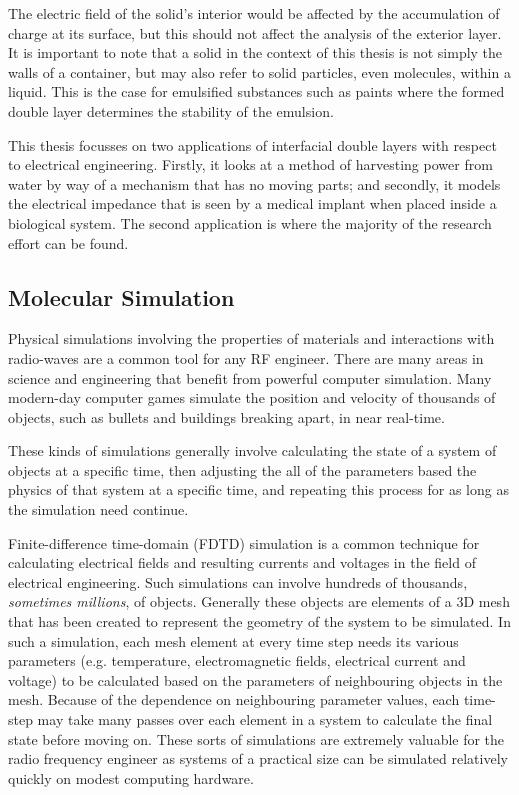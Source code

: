 {The electric field of the solid's interior would be affected by the accumulation of charge at its surface, but this should not affect the analysis of the exterior layer.
It is important to note that a solid in the context of this thesis is not simply the walls of a container, but may also refer to solid particles, even molecules, within a liquid.
This is the case for emulsified substances such as paints where the formed double layer determines the stability of the emulsion.

This thesis focusses on two applications of interfacial double layers with respect to electrical engineering. Firstly, it looks at a method of harvesting power from water by way of a mechanism that has no moving parts; and secondly, it models the electrical impedance that is seen by a medical implant when placed inside a biological system. The second application is where the majority of the research effort can be found.

\subsection{Molecular Simulation}
Physical simulations involving the properties of materials and interactions with radio-waves are a common tool for any RF engineer. There are many areas in science and engineering that benefit from powerful computer simulation. Many modern-day computer games simulate the position and velocity of thousands of objects, such as bullets and buildings breaking apart, in near real-time.

These kinds of simulations generally involve calculating the state of a system of objects at a specific time, then adjusting the all of the parameters based the physics of that system at a specific time, and repeating this process for as long as the simulation need continue.

Finite-difference time-domain (FDTD) simulation is a common technique for calculating electrical fields and resulting currents and voltages in the field of electrical engineering. Such simulations can involve hundreds of thousands, \emph{sometimes millions}, of objects. Generally these objects are elements of a 3D mesh that has been created to represent the geometry of the system to be simulated. In such a simulation, each mesh element at every time step needs its various parameters (e.g. temperature, electromagnetic fields, electrical current and voltage) to be calculated based on the parameters of neighbouring objects in the mesh. Because of the dependence on neighbouring parameter values, each time-step may take many passes over each element in a system to calculate the final state before moving on. These sorts of simulations are extremely valuable for the radio frequency engineer as systems of a practical size can be simulated relatively quickly on modest computing hardware.

}
